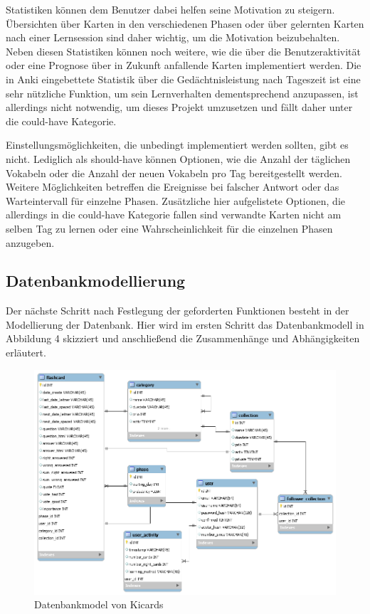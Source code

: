 Statistiken können dem Benutzer dabei helfen seine Motivation zu steigern. Übersichten über Karten in den verschiedenen Phasen oder über gelernten Karten nach einer Lernsession sind daher wichtig, um die Motivation beizubehalten. Neben diesen Statistiken können noch weitere, wie die über die Benutzeraktivität oder eine Prognose über in Zukunft anfallende Karten implementiert werden. Die in Anki eingebettete Statistik über die Gedächtnisleistung nach Tageszeit ist eine sehr nützliche Funktion, um sein Lernverhalten dementsprechend anzupassen, ist allerdings nicht notwendig, um dieses Projekt umzusetzen und fällt daher unter die could-have Kategorie.

Einstellungsmöglichkeiten, die unbedingt implementiert werden sollten, gibt es nicht. Lediglich als should-have können Optionen, wie die Anzahl der täglichen Vokabeln oder die Anzahl der neuen Vokabeln pro Tag bereitgestellt werden. Weitere Möglichkeiten betreffen die Ereignisse bei falscher Antwort oder das Warteintervall für einzelne Phasen. Zusätzliche hier aufgelistete Optionen, die allerdings in die could-have Kategorie fallen sind verwandte Karten nicht am selben Tag zu lernen oder eine Wahrscheinlichkeit für die einzelnen Phasen anzugeben. 




\subsection{Datenbankmodellierung}
Der nächste Schritt nach Festlegung der geforderten Funktionen besteht in der Modellierung der Datenbank. Hier wird im ersten Schritt das Datenbankmodell in Abbildung 4 skizziert und anschließend die Zusammenhänge und Abhängigkeiten erläutert. 

\begin{figure}[htbp]
 \includegraphics[width = 15cm]{databasemodel.png}
 \caption{Datenbankmodel von Kicards}
 \label{fig:datenbankmodel}
\end{figure}

